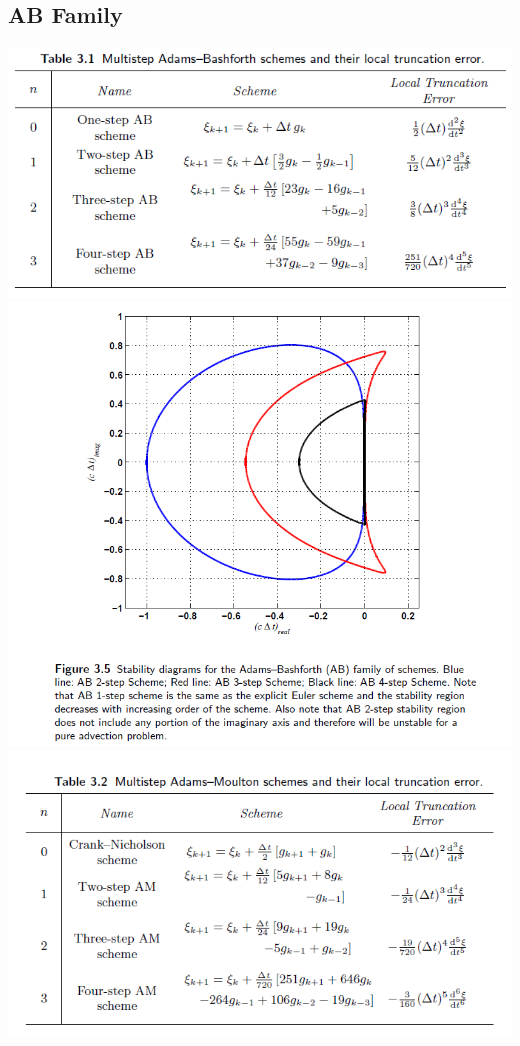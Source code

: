 \documentclass{article}
\begin{document}
\subsection{AB Family}
\centering
\includegraphics{ab}
\centering
\includegraphics{abstability}
\includegraphics{am}
\end{document}
